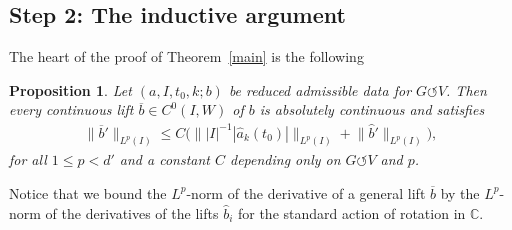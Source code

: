 \documentclass[pdftex]{sigma}
\numberwithin{equation}{section}
\newtheorem{Proposition}[Theorem]{Proposition}
 { \theoremstyle{definition}
\newtheorem{Definition}[Theorem]{Definition}
\newtheorem{Note}[Theorem]{Note}
\newtheorem{Example}[Theorem]{Example}
\newtheorem{Remark}[Theorem]{Remark}
\newtheorem{Question}[Theorem]{Question} }
\def\C{\mathbb{C}}
\def\ol{\overline}
\def\we{\hat}
\def\acts{\circlearrowleft}
\begin{document}
\subsection*{Step 2: The inductive argument}

The heart of the proof of Theorem~\ref{main} is the following


\begin{Proposition} \label{induction}
 Let $(a, I, t_0, k; b)$ be reduced admissible data for $G \acts V$.
 Then every con\-ti\-nuous lift $\ol b \in C^0(I,W)$ of $b$ is absolutely con\-ti\-nuous and satisfies
 \begin{gather} \label{muab}
 \|\ol b'\|_{L^p(I)} \le C \Big( \| |I|^{-1} {|\we a_k(t_0)|} \|_{L^p (I)}
 + \big\|\we b'\big\|_{L^p (I)}\Big),
 \end{gather}
 for all $1 \le p < d'$ and a constant $C$ depending only on $G \acts V$ and $p$.
\end{Proposition}




\begin{Remark}
 Notice that we bound the $L^p$-norm of the derivative of a general lift $\ol b$
 by the $L^p$-norm of the derivatives of the lifts $\we b_i$ for the standard action of rotation in $\C$.
\end{Remark}
\end{document}
